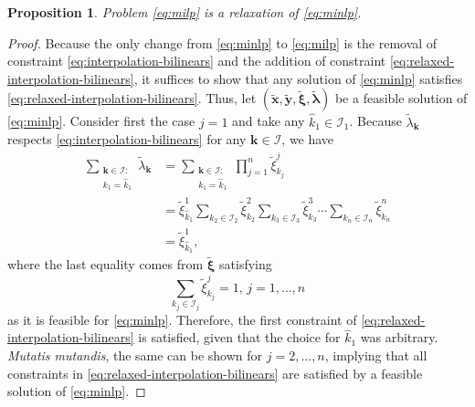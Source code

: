 \documentclass[10pt,a4paper]{amsart}
\newtheorem{proposition}{Proposition}
\newcommand{\new}[1]{#1}
\begin{document}
\begin{proposition}\label{prop}
    Problem \ref{eq:milp} is a relaxation of \ref{eq:minlp}.
\end{proposition}

\begin{proof}
    Because the only change from \ref{eq:minlp} to \ref{eq:milp} is the removal of constraint \eqref{eq:interpolation-bilinears} and the addition of constraint \eqref{eq:relaxed-interpolation-bilinears}, it suffices to show that any solution of \ref{eq:minlp} satisfies \eqref{eq:relaxed-interpolation-bilinears}.
    Thus, let $( \widetilde{\bm{x}}, \widetilde{\bm{y}}, \widetilde{\bm{\xi}},\widetilde{\bm{\lambda}} ) $ be a feasible solution of \ref{eq:minlp}.
    \new{%
    Consider first the case $j=1$ and take any $\hat{k}_1\in\mathcal{I}_1$.
    Because $\widetilde{\lambda}_{\bm{k}}$ respects \eqref{eq:interpolation-bilinears} for any $\bm{k}\in\mathcal{I}$, we have
    \begin{equation}
    \begin{aligned}
        \sum_{\substack{\bm{k} \in \mathcal{I}: \\ k_1 = \hat{k}_1}} \widetilde{\lambda}_{\bm{k}}
            &= \sum_{\substack{\bm{k} \in \mathcal{I}: \\ k_1 = \hat{k}_1}} \prod_{j=1}^{n} \widetilde{\xi}^j_{k_j} \\
            &= \widetilde{\xi}^1_{\hat{k}_1} \sum_{k_2 \in \mathcal{I}_2} \widetilde{\xi}^2_{k_2} \sum_{k_3 \in \mathcal{I}_3} \widetilde{\xi}^3_{k_3} \cdots \sum_{k_n \in \mathcal{I}_n}  \widetilde{\xi}^n_{k_n} \\
            &= \widetilde{\xi}^1_{\hat{k}_1},
    \end{aligned}
    \end{equation}
    where the last equality comes from $\widetilde{\bm{\xi}}$ satisfying
    \begin{equation}
	\sum_{k_j\in \mathcal{I}_j} \widetilde{\xi}^j_{k_j} = 1,\,j=1,\ldots,n
    \end{equation}
    as it is feasible for \ref{eq:minlp}.
    Therefore, the first constraint of \eqref{eq:relaxed-interpolation-bilinears} is satisfied, given that the choice for $\hat{k}_1$ was arbitrary.
    \emph{Mutatis mutandis}, the same can be shown for $j=2,\ldots,n$, implying that all constraints in \eqref{eq:relaxed-interpolation-bilinears} are satisfied by a feasible solution of \ref{eq:minlp}.
    }
\end{proof}
\end{document}

